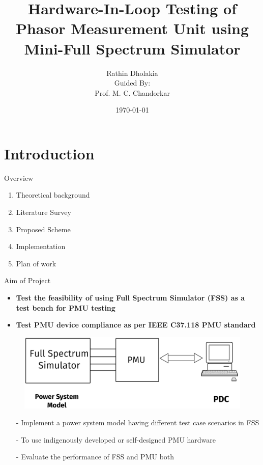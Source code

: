 \documentclass{beamer}
\title{ Hardware-In-Loop Testing of Phasor Measurement Unit using Mini-Full Spectrum Simulator}
\date{\today}
\author{Rathin Dholakia \\Guided By:\\ Prof. M. C. Chandorkar}
\institute{MTP Stage - 1}
\begin{document}
  \maketitle
  \section{Introduction}


  \begin{frame}{Overview}
 	\begin{enumerate}
  	\item Theoretical background
  	\item Literature Survey
  	\item Proposed Scheme
  	\item Implementation
  	\item Plan of work
 	\end{enumerate}
   \end{frame}
 
 
 \begin{frame}{Aim of Project}
  \begin{itemize}
  \item \textbf{Test the feasibility of using Full Spectrum Simulator (FSS) as a test bench for PMU testing}
  \item \textbf{Test PMU device compliance as per IEEE C37.118 PMU standard}
  \end{itemize}

 \begin{figure}
 \includegraphics*[scale=0.1]{Aim.png}
 \end{figure}

 \begin{itemize}
	 \item[-] Implement a power system model having different test case scenarios in FSS
  	\item[-] To use indigenously developed or self-designed PMU hardware
	 \item[-] Evaluate the performance of FSS and PMU both
 \end{itemize}
 

 \end{frame} 
 
\end{document}
